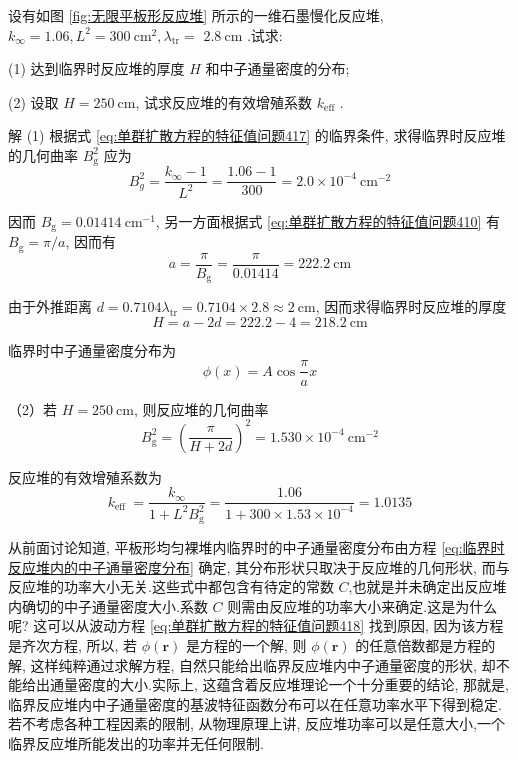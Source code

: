 \documentclass{Sichuan Normal University}
\begin{document}
\begin{example}

     设有如图 \ref{fig:无限平板形反应堆} 所示的一维石墨慢化反应堆, $k_{\infty}=1.06, L^2=300 \mathrm{~cm}^2, \lambda_{\mathrm{tr}}=$ $2.8 \mathrm{~cm}$ .试求:

(1) 达到临界时反应堆的厚度 $H$ 和中子通量密度的分布;

(2) 设取 $H=250 \mathrm{~cm}$, 试求反应堆的有效增殖系数 $k_{\mathrm{eff}}$ .

解 (1) 根据式 \eqref{eq:单群扩散方程的特征值问题417} 的临界条件, 求得临界时反应堆的几何曲率 $B_{\mathrm{g}}^2$ 应为
\begin{equation}
B_g^2=\frac{k_{\infty}-1}{L^2}=\frac{1.06-1}{300}=2.0 \times 10^{-4} \mathrm{~cm}^{-2}
\end{equation}

因而 $B_{\mathrm{g}}=0.01414 \mathrm{~cm}^{-1}$, 另一方面根据式 \eqref{eq:单群扩散方程的特征值问题410} 有 $B_{\mathrm{g}}=\pi / a$, 因而有
\begin{equation}
a=\frac{\pi}{B_{\mathrm{g}}}=\frac{\pi}{0.01414}=222.2 \mathrm{~cm}
\end{equation}

由于外推距离 $d=0.7104 \lambda_{\mathrm{tr}}=0.7104 \times 2.8 \approx 2 \mathrm{~cm}$, 因而求得临界时反应堆的厚度
\begin{equation}
H=a-2 d=222.2-4=218.2 \mathrm{~cm}
\end{equation}

临界时中子通量密度分布为
\begin{equation}
\phi(x)=A \cos \frac{\pi}{a} x
\end{equation}

（2）若 $H=250 \mathrm{~cm}$, 则反应堆的几何曲率
\begin{equation}
B_{\mathrm{g}}^2=\left(\frac{\pi}{H+2 d}\right)^2=1.530 \times 10^{-4} \mathrm{~cm}^{-2}
\end{equation}

反应堆的有效增殖系数为
\begin{equation}
k_{\text {eff }}=\frac{k_{\infty}}{1+L^2 B_{\mathrm{g}}^2}=\frac{1.06}{1+300 \times 1.53 \times 10^{-4}}=1.0135
\end{equation}
    
\end{example}


从前面讨论知道, 平板形均匀裸堆内临界时的中子通量密度分布由方程 \eqref{eq:临界时反应堆内的中子通量密度分布} 确定, 其分布形状只取决于反应堆的几何形状, 而与反应堆的功率大小无关.这些式中都包含有待定的常数 $C$,也就是并未确定出反应堆内确切的中子通量密度大小.系数 $C$ 则需由反应堆的功率大小来确定.这是为什么呢? 这可以从波动方程 \eqref{eq:单群扩散方程的特征值问题418} 找到原因, 因为该方程是齐次方程, 所以, 若 $\phi(\boldsymbol{r})$ 是方程的一个解, 则 $\phi(\boldsymbol{r})$ 的任意倍数都是方程的解, 这样纯粹通过求解方程, 自然只能给出临界反应堆内中子通量密度的形状, 却不能给出通量密度的大小.实际上, 这蕴含着反应堆理论一个十分重要的结论, 那就是, 临界反应堆内中子通量密度的基波特征函数分布可以在任意功率水平下得到稳定.若不考虑各种工程因素的限制, 从物理原理上讲, 反应堆功率可以是任意大小,一个临界反应堆所能发出的功率并无任何限制.
    
\end{document}
